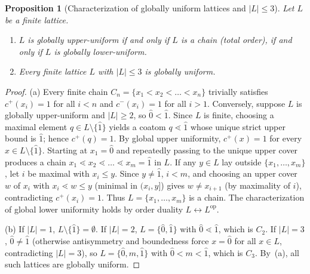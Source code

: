\documentclass[11pt,a4paper]{article}
\newtheorem{proposition}[theorem]{Proposition}
\theoremstyle{definition}
\theoremstyle{remark}
\newcommand{\cov}{\lessdot}
\newcommand{\op}{\mathrm{op}}
\begin{document}
\begin{proposition}[Characterization of globally uniform lattices and $|L| \le 3$]\label{prop:global-chains}
Let $L$ be a finite lattice.
\begin{enumerate}
  \item[(a)] $L$ is globally upper-uniform if and only if $L$ is a chain (total order), if and only if $L$ is globally lower-uniform.
  \item[(b)] Every finite lattice $L$ with $|L| \le 3$ is globally uniform.
\end{enumerate}
\end{proposition}
\begin{proof}
(a) Every finite chain $C_n = \{x_1 < x_2 < \dots < x_n\}$ trivially satisfies $c^+(x_i) = 1$ for all $i < n$ and $c^-(x_i) = 1$ for all $i > 1$. Conversely, suppose $L$ is globally upper-uniform and $|L| \ge 2$, so $\hat{0} < \hat{1}$. Since $L$ is finite, choosing a maximal element $q \in L \setminus \{\hat{1}\}$ yields a coatom $q \cov \hat{1}$ whose unique strict upper bound is $\hat{1}$; hence $c^+(q) = 1$. By global upper uniformity, $c^+(x) = 1$ for every $x \in L \setminus \{\hat{1}\}$. Starting at $x_1 = \hat{0}$ and repeatedly passing to the unique upper cover produces a chain $x_1 \cov x_2 \cov \dots \cov x_m = \hat{1}$ in $L$. If any $y \in L$ lay outside $\{x_1, \dots, x_m\}$, let $i$ be maximal with $x_i \le y$. Since $y \neq \hat{1}$, $i < m$, and choosing an upper cover $w$ of $x_i$ with $x_i \cov w \le y$ (minimal in $(x_i, y]$) gives $w \neq x_{i+1}$ (by maximality of $i$), contradicting $c^+(x_i) = 1$. Thus $L = \{x_1, \dots, x_m\}$ is a chain. The characterization of global lower uniformity holds by order duality $L \leftrightarrow L^\op$.

(b) If $|L| = 1$, $L \setminus \{\hat{1}\} = \emptyset$. If $|L| = 2$, $L = \{\hat{0}, \hat{1}\}$ with $\hat{0} \cov \hat{1}$, which is $C_2$. If $|L| = 3$, $\hat{0} \neq \hat{1}$ (otherwise antisymmetry and boundedness force $x = \hat{0}$ for all $x \in L$, contradicting $|L| = 3$), so $L = \{\hat{0}, m, \hat{1}\}$ with $\hat{0} < m < \hat{1}$, which is $C_3$. By~(a), all such lattices are globally uniform.
\end{proof}
\end{document}
